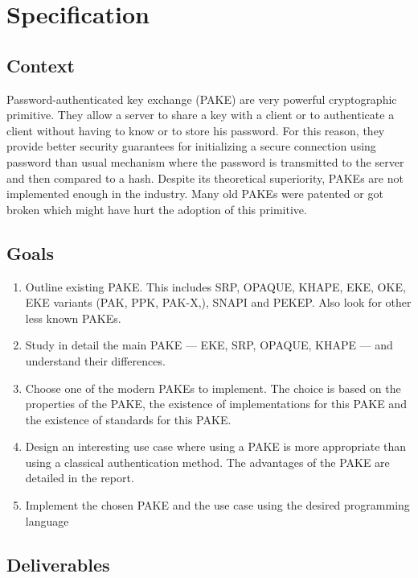 ﻿\documentclass[../report.tex]{subfiles}
\begin{document}
\chapter{Specification}



\section*{Context}

Password-authenticated key exchange (PAKE) are very powerful cryptographic primitive. They allow a server to share a key with a client or to authenticate a client without having to know or to store his password.
For this reason, they provide better security guarantees for initializing a secure connection using password than usual mechanism where the password is transmitted to the server and then compared to a hash.
Despite its theoretical superiority, PAKEs are not implemented enough in the industry. Many old PAKEs were patented or got broken which might have hurt the adoption of this primitive.



\section*{Goals}

\begin{enumerate}
 \item Outline existing PAKE. This includes SRP, OPAQUE, KHAPE, EKE, OKE, EKE variants (PAK, PPK, PAK-X,), SNAPI and PEKEP. Also look for other less known PAKEs.
 \item Study in detail the main PAKE --- EKE, SRP, OPAQUE, KHAPE --- and understand their differences.
 \item Choose one of the modern PAKEs to implement. The choice is based on the properties of the PAKE, the existence of implementations for this PAKE and the existence of standards for this PAKE.
 \item Design an interesting use case where using a PAKE is more appropriate than using a classical authentication method. The advantages of the PAKE are detailed in the report.
 \item Implement the chosen PAKE and the use case using the desired programming language
\end{enumerate}



\section*{Deliverables}
\end{document}
